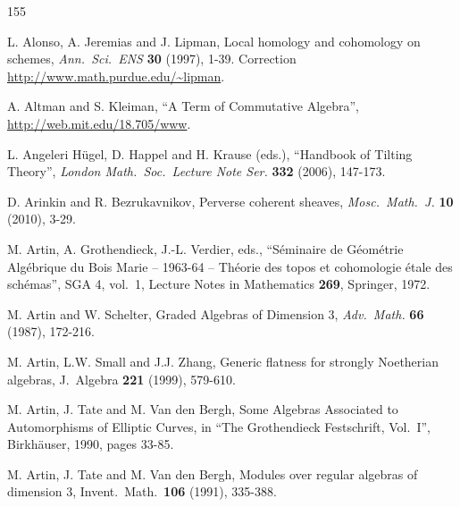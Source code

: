 
%


\renewcommand{\thisfile}{block7\_190328}
\renewcommand{\bibname}{References}  

\cleardoublepage


\begin{thebibliography}{155} 
\label{references}


\setlength{\parskip}{0pt}
\setlength{\itemsep}{1pt}   %
\setlength{\baselineskip}{11.5pt}

  L. Alonso, A. Jeremias and J. Lipman,
Local homology and cohomology on schemes, 
{\em Ann.\ Sci.\ ENS} {\bf 30} (1997), 1-39.
Correction   
\url{http://www.math.purdue.edu/~lipman}.

 A. Altman and S. Kleiman, 
``A Term of Commutative Algebra'', 
\url{http://web.mit.edu/18.705/www}.

 L. Angeleri H\"ugel, D. Happel and H. Krause (eds.),
``Handbook of Tilting Theory'', 
{\em London Math.\ Soc.\ Lecture Note Ser.} {\bf 332} (2006), 147-173.

 D. Arinkin and R. Bezrukavnikov, 
Perverse coherent sheaves,
{\em Mosc.\ Math.\ J.} {\bf 10} (2010), 3-29.	

M. Artin, A. Grothendieck, J.-L. Verdier, eds., ``S\'eminaire de 
G\'eom\'etrie Alg\'ebrique du Bois Marie -- 1963-64 -- Th\'eorie des topos et 
cohomologie \'etale des sch\'emas'', SGA 4, vol.\ 1, Lecture Notes in 
Mathematics {\bf 269}, Springer, 1972. 

 M. Artin and W. Schelter,
Graded Algebras of Dimension $3$, {\em Adv.\ Math.} {\bf 66} (1987), 172-216.

 M. Artin, L.W. Small and J.J. Zhang, 
Generic flatness for strongly Noetherian algebras, 
J.\ Algebra {\bf 221} (1999), 579-610.

 M. Artin, J. Tate and M. Van den Bergh,
Some Algebras Associated to Automorphisms of Elliptic Curves,
in ``The Grothendieck Festschrift, Vol.\ I'', Birkh\"auser, 1990, pages 33-85.

 M. Artin, J. Tate and M. Van den Bergh,
Modules over regular algebras of dimension 3,
Invent.\ Math.\ {\bf 106} (1991), 335-388.


\end{thebibliography}
